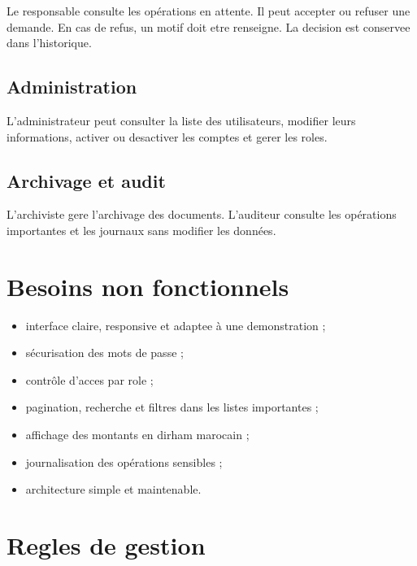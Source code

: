 \documentclass[12pt,a4paper]{report}
\begin{document}
Le responsable consulte les opérations en attente. Il peut accepter ou refuser une demande. En cas de refus, un motif doit etre renseigne. La decision est conservee dans l'historique.

\subsection{Administration}

L'administrateur peut consulter la liste des utilisateurs, modifier leurs informations, activer ou desactiver les comptes et gerer les roles.

\subsection{Archivage et audit}

L'archiviste gere l'archivage des documents. L'auditeur consulte les opérations importantes et les journaux sans modifier les données.

\section{Besoins non fonctionnels}

\begin{itemize}
  \item interface claire, responsive et adaptee à une demonstration ;
  \item sécurisation des mots de passe ;
  \item contrôle d'acces par role ;
  \item pagination, recherche et filtres dans les listes importantes ;
  \item affichage des montants en dirham marocain ;
  \item journalisation des opérations sensibles ;
  \item architecture simple et maintenable.
\end{itemize}

\section{Regles de gestion}
\end{document}
